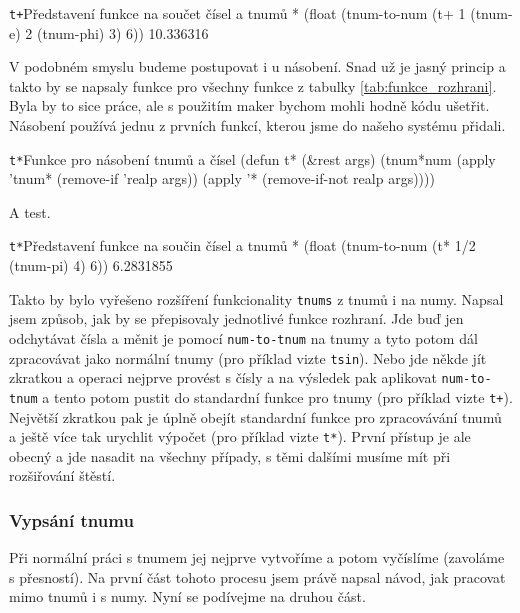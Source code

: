 \begin{lisptest}{\texttt{t+}}{Představení funkce na součet čísel a tnumů}
* (float (tnum-to-num (t+ 1 (tnum-e) 2 (tnum-phi) 3) 6))
10.336316
\end{lisptest}

V podobném smyslu budeme postupovat i u násobení. Snad už je jasný princip a takto by se napsaly funkce pro všechny funkce z tabulky \ref{tab:funkce_rozhrani}. Byla by to sice práce, ale s použitím maker bychom mohli hodně kódu ušetřit. Násobení používá jednu z prvních funkcí, kterou jsme do našeho systému přidali.

\begin{lispcode}{\texttt{t*}}{Funkce pro násobení tnumů a čísel}
(\textcolor{funkcionalni}{defun} \textcolor{pojmenovan}{t*} (&rest args)
  (\textcolor{moje}{tnum*num} (\textcolor{funkcionalni}{apply} '\textcolor{moje}{tnum*} (\textcolor{funkcionalni}{remove-if} '\textcolor{moje}{realp} args))
    (\textcolor{funkcionalni}{apply} '\textcolor{moje}{*} (\textcolor{funkcionalni}{remove-if-not} \textquotesingle\textcolor{moje}{realp} args))))
\end{lispcode}

A test.

\begin{lisptest}{\texttt{t*}}{Představení funkce na součin čísel a tnumů}
* (float (tnum-to-num (t* 1/2 (tnum-pi) 4) 6))
6.2831855
\end{lisptest}

Takto by bylo vyřešeno rozšíření funkcionality \texttt{tnums} z tnumů i na numy. Napsal jsem způsob, jak by se přepisovaly jednotlivé funkce rozhraní. Jde buď jen odchytávat čísla a měnit je pomocí \texttt{num-to-tnum} na tnumy a tyto potom dál zpracovávat jako normální tnumy (pro příklad vizte \texttt{tsin}). Nebo jde někde jít zkratkou a operaci nejprve provést s čísly a na výsledek pak aplikovat \texttt{num-to-tnum} a tento potom pustit do standardní funkce pro tnumy (pro příklad vizte \texttt{t+}). Největší zkratkou pak je úplně obejít standardní funkce pro zpracovávání tnumů a ještě více tak urychlit výpočet (pro příklad vizte \texttt{t*}). První přístup je ale obecný a jde nasadit na všechny případy, s těmi dalšími musíme mít při rozšiřování štěstí.

\subsubsection{Vypsání tnumu}
Při normální práci s tnumem jej nejprve vytvoříme a potom vyčíslíme (zavoláme s přesností). Na první část tohoto procesu jsem právě napsal návod, jak pracovat mimo tnumů i s numy. Nyní se podívejme na druhou část.

